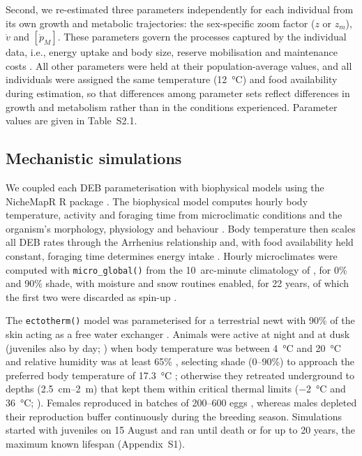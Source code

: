 \documentclass[12pt]{article}
\begin{document}
Second, we re-estimated three parameters independently for each individual from its own growth and metabolic trajectories: the sex-specific zoom factor ($z$ or $z_m$), $\dot{v}$ and $[\dot{p}_M]$. These parameters govern the processes captured by the individual data, i.e., energy uptake and body size, reserve mobilisation and maintenance costs \parencite{kooijman2021}. All other parameters were held at their population-average values, and all individuals were assigned the same temperature (\qty{12}{\celsius}) and food availability during estimation, so that differences among parameter sets reflect differences in growth and metabolism rather than in the conditions experienced. Parameter values are given in Table~S2.1.

\subsection{Mechanistic simulations}

We coupled each DEB parameterisation with biophysical models using the NicheMapR R package \parencite{kearney2017a,kearney2020c}. The biophysical model computes hourly body temperature, activity and foraging time from microclimatic conditions and the organism's morphology, physiology and behaviour \parencite{porter1973,kearney2018}. Body temperature then scales all DEB rates through the Arrhenius relationship and, with food availability held constant, foraging time determines energy intake \parencite{kearney2012a,kearney2020c}. Hourly microclimates were computed with \texttt{micro\_global()} from the 10~arc-minute climatology of \textcite{new2002}, for 0\% and 90\% shade, with moisture and snow routines enabled, for 22 years, of which the first two were discarded as spin-up \parencite{kearney2014,kearney2018a,kearney2020b}.

The \texttt{ectotherm()} model was parameterised for a terrestrial newt with 90\% of the skin acting as a free water exchanger \parencite{enriquez-urzelai2024}. Animals were active at night and at dusk (juveniles also by day; \cite{enriquez-urzelai2020}) when body temperature was between \qty{4}{\celsius} and \qty{20}{\celsius} and relative humidity was at least 65\% \parencite{bonnefond2020,giacometti2025}, selecting shade (0--90\%) to approach the preferred body temperature of \qty{17.3}{\celsius} \parencite{gvozdik2017}; otherwise they retreated underground to depths (\qty{2.5}{\cm}--\qty{2}{\m}) that kept them within critical thermal limits (\qty{-2}{\celsius} and \qty{36}{\celsius}; \cite{enriquez-urzelai2024}). Females reproduced in batches of 200--600 eggs \parencite{pecquerie2009}, whereas males depleted their reproduction buffer continuously during the breeding season. Simulations started with juveniles on 15 August and ran until death or for up to 20 years, the maximum known lifespan (Appendix~S1).
\end{document}
